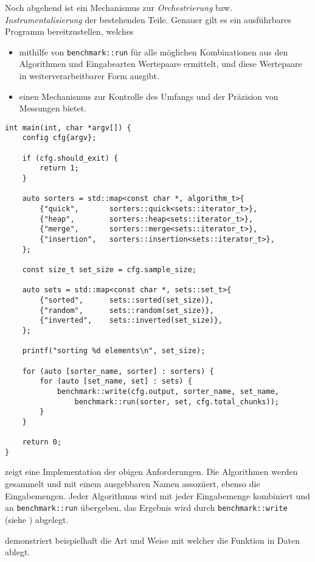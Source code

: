 Noch abgehend ist ein Mechanismus zur \emph{Orchestrierung} bzw. \emph{Instrumentalisierung} der bestehenden Teile. Genauer gilt es ein ausführbares Programm bereitzustellen, welches

\begin{itemize}
    \item mithilfe von \lstinline{benchmark::run} für alle möglichen Kombinationen aus den Algorithmen und Eingabearten Wertepaare ermittelt, und diese Wertepaare in weiterverarbeitbarer Form ausgibt.

    \item einen Mechanismus zur Kontrolle des Umfangs und der Präzision von Messungen bietet.
\end{itemize}

\begin{lstlisting}[label=lst:main, caption={Die \lstinline{main} Funktion des zur Ermittlung der praktischen Effizienz verwendeten Programms.}]
int main(int, char *argv[]) {
	config cfg{argv};

	if (cfg.should_exit) {
		return 1;
	}

	auto sorters = std::map<const char *, algorithm_t>{
		{"quick",       sorters::quick<sets::iterator_t>},
		{"heap",        sorters::heap<sets::iterator_t>},
		{"merge",       sorters::merge<sets::iterator_t>},
		{"insertion",   sorters::insertion<sets::iterator_t>},
	};

	const size_t set_size = cfg.sample_size;

	auto sets = std::map<const char *, sets::set_t>{
		{"sorted",      sets::sorted(set_size)},
		{"random",      sets::random(set_size)},
		{"inverted",    sets::inverted(set_size)},
	};

	printf("sorting %d elements\n", set_size);

	for (auto [sorter_name, sorter] : sorters) {
		for (auto [set_name, set] : sets) {
			benchmark::write(cfg.output, sorter_name, set_name,
				benchmark::run(sorter, set, cfg.total_chunks));
		}
	}

	return 0;
}
\end{lstlisting}

 zeigt eine Implementation der obigen Anforderungen. Die Algorithmen werden gesammelt und mit einem ausgebbaren Namen assoziiert, ebenso die Eingabemengen. Jeder Algorithmus wird mit jeder Eingabemenge kombiniert und an \lstinline{benchmark::run} übergeben, das Ergebnis wird durch \lstinline{benchmark::write} (siehe ) abgelegt.

 demonstriert beispielhaft die Art und Weise mit welcher die Funktion in  Daten ablegt.


